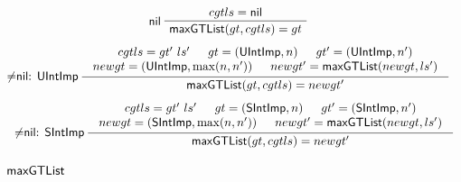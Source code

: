 \begin{figure}[htbp]
  \begin{gather*}
    \infer[\nil]
    {\seqq{\maxgtlist(gt, cgtls) = gt}}
    {\seqq{cgtls = \nil}}
    \quad
   \\[1ex]
    \infer[$\neq$\nil: \uintimp]
    {\seqq{\maxgtlist(gt, cgtls) =  newgt'}}
    {
    \begin{array}{c}
      cgtls = gt' \ ls' \hspace{15pt} 
      gt = (\uintimp, n)  \hspace{15pt} 
      gt' = (\uintimp, n') \\
      newgt = (\uintimp, \max(n, n')) \hspace{15pt}  newgt' = \maxgtlist(newgt, ls')
    \end{array}
    }
    \quad
   \\[1ex]
    \infer[$\neq$\nil: \sintimp]
    {\seqq{\maxgtlist(gt, cgtls) =  newgt'}}
    {
    \begin{array}{c}
      cgtls = gt' \ ls' \hspace{15pt} 
      gt = (\sintimp, n)  \hspace{15pt} 
      gt' = (\sintimp, n') \\
      newgt = (\sintimp, \max(n, n')) \hspace{15pt}  newgt' = \maxgtlist(newgt, ls')
    \end{array}
    }
  \end{gather*}
  \caption{${\sf maxGTList}$}
  \label{fig:maxgtlist}
\end{figure}


